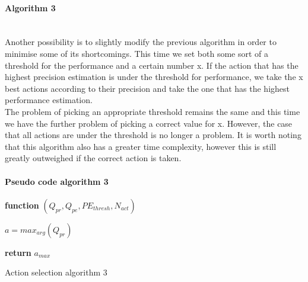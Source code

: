 \paragraph{Algorithm 3}\mbox{}\\
Another possibility is to slightly modify the previous algorithm in order to minimise some of its shortcomings. This time we set both some sort of a threshold for the performance and a certain number x. If the action that has the highest precision estimation is under the threshold for performance, we take the x best actions according to their precision and take the one that has the highest performance estimation.\\
The problem of picking an appropriate threshold remains the same and this time we have the further problem of picking a correct value for x. However, the case that all actions are under the threshold is no longer a problem. It is worth noting that this algorithm also has a greater time complexity, however this is still greatly outweighed if the correct action is taken.
\paragraph{Pseudo code algorithm 3}
\begin{center}
	\begin{algorithm}[H]

    \textbf{function}  $(Q_{pr},Q_{pe},PE_{thresh},N_{act})$\;
    
    
    \Indp{}\Indm
    \Indp{} \Indm
    \Indp
   	$a=max_{arg}(Q_{pr})$\\
    
   
  
   \textbf{return} $a_{max}$
   
    
\caption{Action selection algorithm 3}
\end{algorithm}
\end{center}
